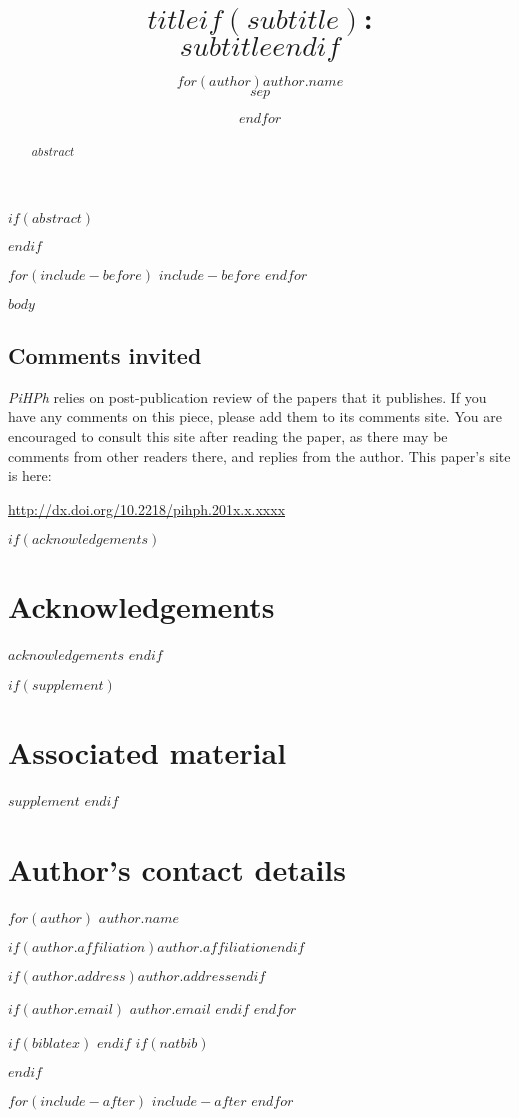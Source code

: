 \documentclass[article, a4paper, 12pt, $for(classoption)$$classoption$$sep$,$endfor$]{memoir}
\date{}
\title{$title$$if(subtitle)$:\\$subtitle$$endif$}
\author{$for(author)$$author.name$\\\affiliation{$author.affiliation$}$sep$ \and $endfor$}
\newcommand\thisdoi{10.2218/pihph.201x.x.xxxx}
\newcommand\thisdoilink{http://dx.doi.org/\thisdoi}
\newcommand\commentsinvited{
\begin{tcdoublebox}

\section*{\textcolor{pihphgreen}{Comments invited}}

\textit{PiHPh} relies on post-publication review of the papers that it publishes. If you have any comments on this piece, please add them to its comments site. You are encouraged to consult this site after reading the paper, as there may be comments from other readers there, and replies from the author. This paper's site is here:

\vspace*{1ex}\noindent \url{\thisdoilink}

\end{tcdoublebox}
}
\begin{document}
\setcounter{page}{1}
\maketitle
\thispagestyle{empty}

$if(abstract)$
\begin{abstract}
\noindent $abstract$
\end{abstract}
$endif$

$for(include-before)$
$include-before$
$endfor$

$body$

\commentsinvited %

$if(acknowledgements)$
\section*{Acknowledgements}
$acknowledgements$
$endif$

$if(supplement)$
\section*{Associated material}
$supplement$
$endif$

\section*{Author's contact details}
\label{sec:auth-cont-deta}

$for(author)$
\noindent \textit{$author.name$}

$if(author.affiliation)$\noindent $author.affiliation$$endif$

$if(author.address)$\noindent $author.address$$endif$

$if(author.email)$
\vspace*{5pt}
\noindent \textit{$author.email$}
$endif$
$endfor$

$if(biblatex)$
\printbibliography[title=References]
$endif$
$if(natbib)$
\renewcommand\bibsection{\section*{References}}

$endif$

$for(include-after)$
$include-after$
$endfor$
\end{document}
